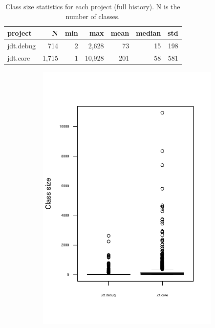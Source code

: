 \begin{table}[!ht]\footnotesize
	\centering
	\begin{tabular}{lrrrrrr}
		\toprule
		project & N & min & max & mean & median & std \\
		\midrule
		jdt.debug & 714 & 2 & 2,628 & 73 & 15 & 198 \\
		jdt.core & 1,715 & 1 & 10,928 & 201 & 58 & 581 \\
		\bottomrule
	\end{tabular} 
	\caption{Class size statistics for each project (full history). N is the number of classes.}
	\label{tab:class-stats}
\end{table}
 
\begin{figure}
        \begin{subfigure}[b]{0.48\textwidth}
                \centering
                \includegraphics[width=\textwidth]{img/class-size-boxplot.pdf}

\end{subfigure}
\end{figure}
